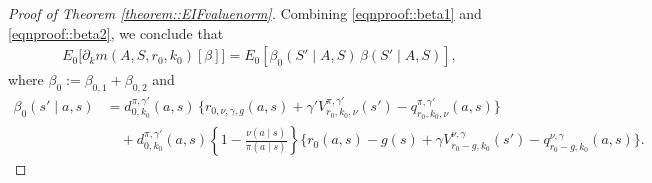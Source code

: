 \documentclass[11pt]{article}
\theoremstyle{plain}
\begin{document}
\begin{proof}[Proof of Theorem \ref{theorem::EIFvaluenorm}]
 


Combining \eqref{eqnproof::beta1} and \eqref{eqnproof::beta2}, we conclude that
\begin{align*}
E_0\!\big[\partial_k m(A,S,r_0,k_0)[\beta]\big]
= E_0\!\left[\beta_0(S' \mid A, S)\,\beta(S' \mid A, S)\right],
\end{align*}
where $\beta_0 := \beta_{0,1} + \beta_{0,2}$ and
\begin{equation}
\label{eqn::proofbetaEIF}
\begin{aligned}
\beta_0(s' \mid a, s) 
&= d_{0,k_0}^{\pi,\gamma'}(a,s)\,\big\{r_{0,\nu,\gamma,g}(a,s) + \gamma' V_{r_0, k_0,\nu}^{\pi,\gamma'}(s') - q_{r_0, k_0,\nu}^{\pi,\gamma'}(a,s)\big\} \\
&\quad + d_{0,k_0}^{\pi,\gamma'}(a,s)\left\{ 1-\tfrac{\nu(a \mid s)}{\pi(a \mid s)} \right\}
          \big\{r_0(a,s) - g(s) + \gamma V_{r_0-g, k_0}^{\nu,\gamma}(s') - q_{r_0-g, k_0}^{\nu,\gamma}(a,s)\big\}.
\end{aligned}
\end{equation}


\end{proof}
\end{document}
